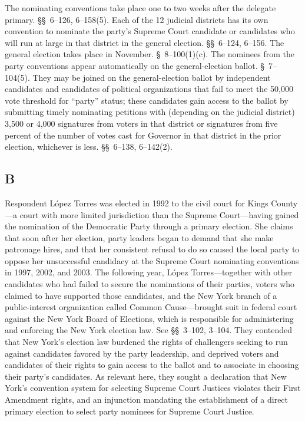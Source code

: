   The nominating conventions take place one to two weeks after the delegate primary. \S\S~6--126, 6--158(5). Each of the 12 judicial districts has its own convention to nominate the \newpage  party's Supreme Court candidate or candidates who will run at large in that district in the general election. \S\S~6--124, 6--156. The general election takes place in November. \S~8--100(1)(c). The nominees from the party conventions appear automatically on the general-election ballot. \S~7--104(5). They may be joined on the general-election ballot by independent candidates and candidates of political organizations that fail to meet the 50,000 vote threshold for ``party'' status; these candidates gain access to the ballot by submitting timely nominating petitions with (depending on the judicial district) 3,500 or 4,000 signatures from voters in that district or signatures from five percent of the number of votes cast for Governor in that district in the prior election, whichever is less. \S\S~6--138, 6--142(2).

\subsection{B}

  Respondent López Torres was elected in 1992 to the civil court for Kings County---a court with more limited jurisdiction than the Supreme Court---having gained the nomination of the Democratic Party through a primary election. She claims that soon after her election, party leaders began to demand that she make patronage hires, and that her consistent refusal to do so caused the local party to oppose her unsuccessful candidacy at the Supreme Court nominating conventions in 1997, 2002, and 2003. The following year, López Torres---together with other candidates who had failed to secure the nominations of their parties, voters who claimed to have supported those candidates, and the New York branch of a public-interest organization called Common Cause---brought suit in federal court against the New York Board of Elections, which is responsible for administering and enforcing the New York election law. See \S\S~3--102, 3--104. They contended that New York's election law burdened the rights of challengers seeking to run against candidates favored by the party leadership, and deprived voters and candidates of their rights to gain access to the ballot and to associate in choosing their party's candidates. As rele\newpage vant here, they sought a declaration that New York's convention system for selecting Supreme Court Justices violates their First Amendment rights, and an injunction mandating the establishment of a direct primary election to select party nominees for Supreme Court Justice.


